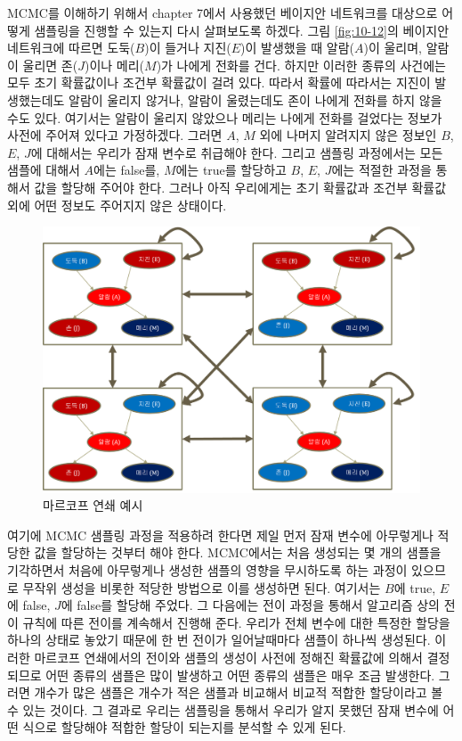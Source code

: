 \documentclass[a4paper]{oblivoir}
\begin{document}
MCMC를 이해하기 위해서 chapter 7에서 사용했던 베이지안 네트워크를 대상으로 어떻게 샘플링을 진행할 수 있는지 다시 살펴보도록 하겠다. 그림 \ref{fig:10-12}의 베이지안 네트워크에 따르면 도둑($B$)이 들거나 지진($E$)이 발생했을 때 알람($A$)이 울리며, 알람이 울리면 존($J$)이나 메리($M$)가 나에게 전화를 건다. 하지만 이러한 종류의 사건에는 모두 초기 확률값이나 조건부 확률값이 걸려 있다. 따라서 확률에 따라서는 지진이 발생했는데도 알람이 울리지 않거나, 알람이 울렸는데도 존이 나에게 전화를 하지 않을 수도 있다. 여기서는 알람이 울리지 않았으나 메리는 나에게 전화를 걸었다는 정보가 사전에 주어져 있다고 가정하겠다. 그러면 $A$, $M$ 외에 나머지 알려지지 않은 정보인 $B$, $E$, $J$에 대해서는 우리가 잠재 변수로 취급해야 한다. 그리고 샘플링 과정에서는 모든 샘플에 대해서 $A$에는 false를, $M$에는 true를 할당하고 $B$, $E$, $J$에는 적절한 과정을 통해서 값을 할당해 주어야 한다. 그러나 아직 우리에게는 초기 확률값과 조건부 확률값 외에 어떤 정보도 주어지지 않은 상태이다. \\

\begin{figure}[ht] \centering 
\includegraphics[scale=0.3]{fig10_11.png} 
\caption{마르코프 연쇄 예시}
\label{fig:10-11}
\end{figure}  

여기에 MCMC 샘플링 과정을 적용하려 한다면 제일 먼저 잠재 변수에 아무렇게나 적당한 값을 할당하는 것부터 해야 한다. MCMC에서는 처음 생성되는 몇 개의 샘플을 기각하면서 처음에 아무렇게나 생성한 샘플의 영향을 무시하도록 하는 과정이 있으므로 무작위 생성을 비롯한 적당한 방법으로 이를 생성하면 된다. 여기서는 $B$에 true, $E$에 false, $J$에 false를 할당해 주었다. 그 다음에는 전이 과정을 통해서 알고리즘 상의 전이 규칙에 따른 전이를 계속해서 진행해 준다. 우리가 전체 변수에 대한 특정한 할당을 하나의 상태로 놓았기 때문에 한 번 전이가 일어날때마다 샘플이 하나씩 생성된다. 이러한 마르코프 연쇄에서의 전이와 샘플의 생성이 사전에 정해진 확률값에 의해서 결정되므로 어떤 종류의 샘플은 많이 발생하고 어떤 종류의 샘플은 매우 조금 발생한다. 그러면 개수가 많은 샘플은 개수가 적은 샘플과 비교해서 비교적 적합한 할당이라고 볼 수 있는 것이다. 그 결과로 우리는 샘플링을 통해서 우리가 알지 못했던 잠재 변수에 어떤 식으로 할당해야 적합한 할당이 되는지를 분석할 수 있게 된다.\\
\end{document}
